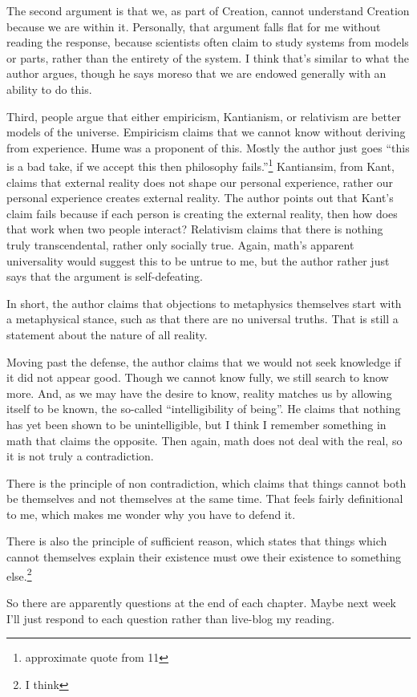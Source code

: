 \documentclass[12pt]{article}[titlepage]
\newcommand{\say}[1]{``#1''}
\newcommand{\1}{\={a}}
\newcommand{\2}{\={e}}
\newcommand{\3}{\={\i}}
\newcommand{\4}{\=o}
\newcommand{\5}{\=u}
\newcommand{\6}{\={A}}
\renewcommand{\,}{\textsuperscript{,}}
\begin{document}
The second argument is that we, as part of Creation, cannot understand Creation because we are within it.
Personally, that argument falls flat for me without reading the response, because scientists often claim to study systems from models or parts, rather than the entirety of the system.
I think that's similar to what the author argues, though he says moreso that we are endowed generally with an ability to do this.

Third, people argue that either empiricism, Kantianism, or relativism are better models of the universe.
Empiricism claims that we cannot know without deriving from experience.
Hume was a proponent of this.
Mostly the author just goes \say{this is a bad take, if we accept this then philosophy fails.}\footnote{approximate quote from 11}
Kantiansim, from Kant, claims that external reality does not shape our personal experience, rather our personal experience creates external reality.
The author points out that Kant's claim fails because if each person is creating the external reality, then how does that work when two people interact?
Relativism claims that there is nothing truly transcendental, rather only socially true.
Again, math's apparent universality would suggest this to be untrue to me, but the author rather just says that the argument is self-defeating.

In short, the author claims that objections to metaphysics themselves start with a metaphysical stance, such as that there are no universal truths.
That is still a statement about the nature of all reality.

Moving past the defense, the author claims that we would not seek knowledge if it did not appear good.
Though we cannot know fully, we still search to know more.
And, as we may have the desire to know, reality matches us by allowing itself to be known, the so-called \say{intelligibility of being}.
He claims that nothing has yet been shown to be unintelligible, but I think I remember something in math that claims the opposite.
Then again, math does not deal with the real, so it is not truly a contradiction.

There is the principle of non contradiction, which claims that things cannot both be themselves and not themselves at the same time.
That feels fairly definitional to me, which makes me wonder why you have to defend it.

There is also the principle of sufficient reason, which states that things which cannot themselves explain their existence must owe their existence to something else.\footnote{I think}

So there are apparently questions at the end of each chapter.
Maybe next week I'll just respond to each question rather than live-blog my reading.
\end{document}
